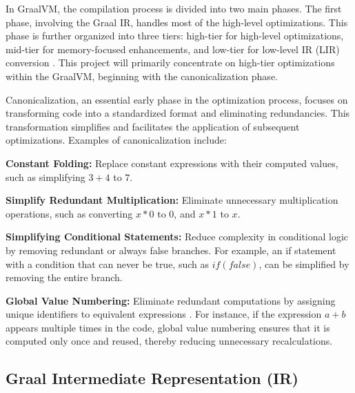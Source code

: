In GraalVM, the compilation process is divided into two main phases. The first phase, involving the Graal IR, handles most of the high-level optimizations. This phase is further organized into three tiers: high-tier for high-level optimizations, mid-tier for memory-focused enhancements, and low-tier for low-level IR (LIR) conversion \cite{Graal2021}. This project will primarily concentrate on high-tier optimizations within the GraalVM, beginning with the canonicalization phase.

Canonicalization, an essential early phase in the optimization process, focuses on transforming code into a standardized format and eliminating redundancies. This transformation simplifies and facilitates the application of subsequent optimizations. Examples of canonicalization include:

\begin{description}
    \item \textbf{Constant Folding:} Replace constant expressions with their computed values, such as simplifying \newline
    \(3 + 4\) to \(7\).
    \newpage
    \item \textbf{Simplify Redundant Multiplication:} Eliminate unnecessary multiplication operations, such as converting \(x * 0\) to 0, and \(x * 1\) to \(x\).
    \item \textbf{Simplifying Conditional Statements:} Reduce complexity in conditional logic by removing redundant or always false branches. For example, an if statement with a condition that can never be true, such as \(if (false)\), can be simplified by removing the entire branch.
    \item \textbf{Global Value Numbering:} Eliminate redundant computations by assigning unique identifiers to equivalent expressions \cite{Cliff1995}. For instance, if the expression \(a + b\) appears multiple times in the code, global value numbering ensures that it is computed only once and reused, thereby reducing unnecessary recalculations.
\end{description}

\subsection{Graal Intermediate Representation (IR)}

